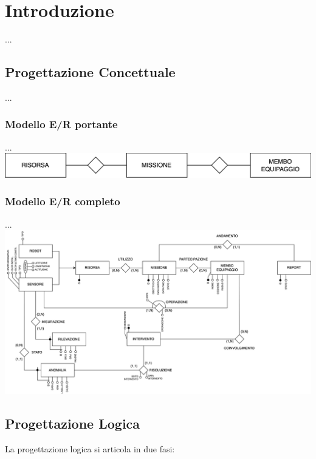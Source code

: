 \documentclass{article}
\begin{document}
\section{Introduzione}


...

\subsection{Progettazione Concettuale}

...

\subsubsection{Modello E/R portante}

...
\includegraphics[width=\textwidth]{Media/schema_portante.png}

\subsubsection{Modello E/R completo}

...
\includegraphics[width=\textwidth]{Media/ER_Completo.png}

\subsection{Progettazione Logica}

La progettazione logica si articola in due fasi:
\end{document}
